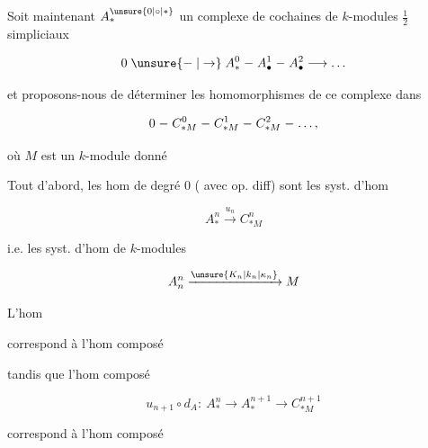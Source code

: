 
Soit maintenant $A_*^{\unsure{0|\circ|*}}$ un  complexe de cochaines de $k$-modules $\frac{1}{2}$ simpliciaux

\[
0\mathrel{\unsure{\relbar|\to}} A_*^0\relbar A_\bullet^1\relbar A_\bullet^2\longrightarrow\ldots
\]

et proposons-nous de déterminer les homomorphismes de ce complexe dans

\[
0\relbar C^0_{*M}\relbar C^1_{*M}\relbar C^2_{*M}\relbar\ldots,
\]

où $M$ est un $k$-module donné

Tout d'abord, les hom de degré $0$ (   avec op. diff) sont les syst. d'hom

\[
A_*^n\xrightarrow{u_n}C^n_{*M}
\]

i.e. les syst. d'hom de $k$-modules

\[
A_n^n\xrightarrow{\unsure{K_n|k_n|\kappa_n}}M
\]

 L'hom 


correspond à  l'hom composé


tandis que l'hom composé

\[
u_{n+1}\circ d_A\mathpunct{:}\ A^n_*\longrightarrow A^{n+1}_*\longrightarrow C^{n+1}_{*M}
\]

correspond à l'hom composé



